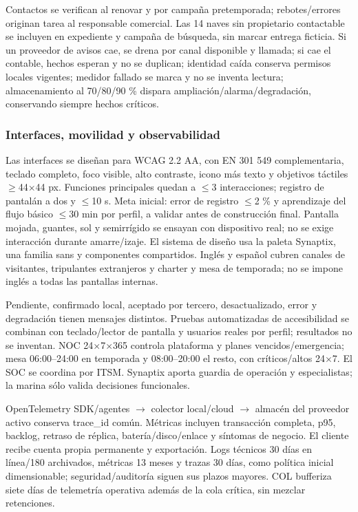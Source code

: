 \documentclass[11pt,letterpaper]{report}
\begin{document}
Contactos se verifican al renovar y por campaña pretemporada; rebotes/errores originan tarea al responsable comercial. Las 14 naves sin propietario contactable se incluyen en expediente y campaña de búsqueda, sin marcar entrega ficticia. Si un proveedor de avisos cae, se drena por canal disponible y llamada; si cae el contable, hechos esperan y no se duplican; identidad caída conserva permisos locales vigentes; medidor fallado se marca y no se inventa lectura; almacenamiento al 70/80/90 \% dispara ampliación/alarma/degradación, conservando siempre hechos críticos.

\subsubsection*{Interfaces, movilidad y observabilidad}
Las interfaces se diseñan para WCAG 2.2 AA, con EN 301 549 complementaria, teclado completo, foco visible, alto contraste, icono más texto y objetivos táctiles $\geq$44$\times$44 px. Funciones principales quedan a $\leq$3 interacciones; registro de pantalán a dos y $\leq$10 s. Meta inicial: error de registro $\leq$2 \% y aprendizaje del flujo básico $\leq$30 min por perfil, a validar antes de construcción final. Pantalla mojada, guantes, sol y semirrígido se ensayan con dispositivo real; no se exige interacción durante amarre/izaje. El sistema de diseño usa la paleta Synaptix, una familia sans y componentes compartidos. Inglés y español cubren canales de visitantes, tripulantes extranjeros y charter y mesa de temporada; no se impone inglés a todas las pantallas internas.

Pendiente, confirmado local, aceptado por tercero, desactualizado, error y degradación tienen mensajes distintos. Pruebas automatizadas de accesibilidad se combinan con teclado/lector de pantalla y usuarios reales por perfil; resultados no se inventan. NOC 24$\times$7$\times$365 controla plataforma y planes vencidos/emergencia; mesa 06:00--24:00 en temporada y 08:00--20:00 el resto, con críticos/altos 24$\times$7. El SOC se coordina por ITSM. Synaptix aporta guardia de operación y especialistas; la marina sólo valida decisiones funcionales.

OpenTelemetry SDK/agentes $\rightarrow$ colector local/cloud $\rightarrow$ almacén del proveedor activo conserva trace\_id común. Métricas incluyen transacción completa, p95, backlog, retraso de réplica, batería/disco/enlace y síntomas de negocio. El cliente recibe cuenta propia permanente y exportación. Logs técnicos 30 días en línea/180 archivados, métricas 13 meses y trazas 30 días, como política inicial dimensionable; seguridad/auditoría siguen sus plazos mayores. COL bufferiza siete días de telemetría operativa además de la cola crítica, sin mezclar retenciones.
\end{document}
